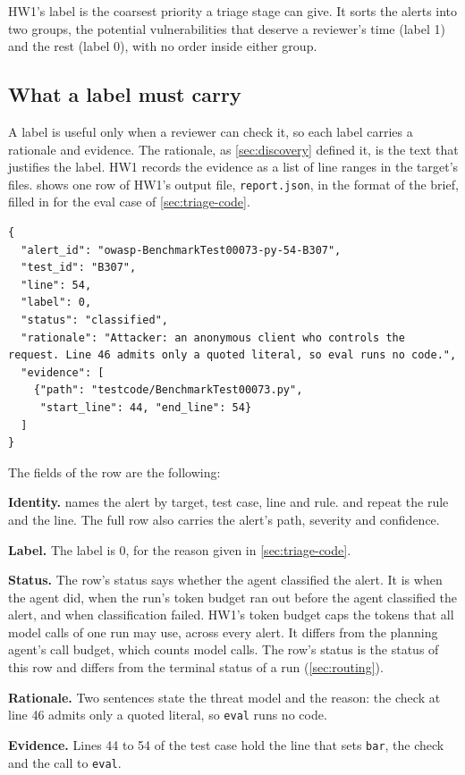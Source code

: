 HW1's label is the coarsest priority a triage stage can give. It sorts the alerts into two groups,
the potential vulnerabilities that deserve a reviewer's time (label 1) and the rest (label 0), with
no order inside either group.

\subsection{What a label must carry}
\label{sec:triage-label}

A label is useful only when a reviewer can check it, so each label carries a rationale and evidence.
The rationale, as \cref{sec:discovery} defined it, is the text that justifies the label. HW1 records
the evidence as a list of line ranges in the target's files.  shows one row of
HW1's output file, \texttt{report.json}, in the format of the brief, filled in for the eval case of
\cref{sec:triage-code}.

\noindent\begin{minipage}{\linewidth}
\begin{lstlisting}[breakatwhitespace=true, basicstyle=\ttfamily\footnotesize, caption={One row of report.json for the alert on eval in BenchmarkTest00073, with three fields cut.}, label=lst:triage-row]
{
  "alert_id": "owasp-BenchmarkTest00073-py-54-B307",
  "test_id": "B307",
  "line": 54,
  "label": 0,
  "status": "classified",
  "rationale": "Attacker: an anonymous client who controls the request. Line 46 admits only a quoted literal, so eval runs no code.",
  "evidence": [
    {"path": "testcode/BenchmarkTest00073.py",
     "start_line": 44, "end_line": 54}
  ]
}
\end{lstlisting}
\end{minipage}

The fields of the row are the following:
\bi
\item \textbf{Identity.}  names the alert by target, test case, line and rule.
 and  repeat the rule and the line. The full row also carries the
alert's path, severity and confidence.
\item \textbf{Label.} The label is 0, for the reason given in \cref{sec:triage-code}.
\item \textbf{Status.} The row's status says whether the agent classified the alert. It is
 when the agent did,  when the run's token budget ran
out before the agent classified the alert, and  when classification failed. HW1's
token budget caps the tokens that all model calls of one run may use, across every alert. It differs
from the planning agent's call budget, which counts model calls. The row's status is the status of
this row and differs from the terminal status of a run (\cref{sec:routing}).
\item \textbf{Rationale.} Two sentences state the threat model and the reason: the check at line 46
admits only a quoted literal, so \texttt{eval} runs no code.
\item \textbf{Evidence.} Lines 44 to 54 of the test case hold the line that sets \texttt{bar}, the
check and the call to \texttt{eval}.
\ei

